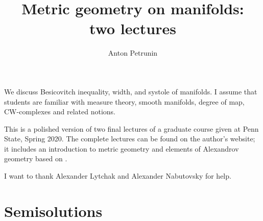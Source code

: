 \documentclass[twoside]{book}
\begin{document}
 
\title{Metric geometry on manifolds:
\\ two lectures}
\author{Anton Petrunin}
\date{}
\maketitle

We discuss Besicovitch inequality, width, and systole of manifolds.
I assume that students are familiar with 
measure theory,
smooth manifolds,
degree of map, 
CW-complexes and related notions.

This is a polished version of two final lectures of a graduate course given at Penn State, Spring 2020.
The complete lectures can be found on the author's website;
it includes an introduction to metric geometry \cite{petrunin2020pure}
and elements of Alexandrov geometry based on \cite{alexander-kapovitch-petrunin-2019}.

I want to thank Alexander Lytchak and Alexander Nabutovsky for help.

\thispagestyle{empty}
\tableofcontents
\thispagestyle{empty}

%



%
%
%
\appendix
\chapter{Semisolutions}


%
{\small\sloppy


\printbibliography[heading=bibintoc]
\fussy
}
\end{document}
